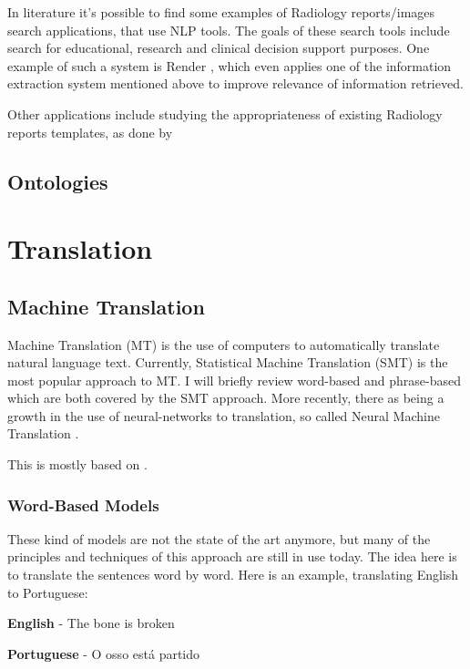 In literature it's possible to find some examples of Radiology reports/images search applications, that use NLP tools. The goals of these search tools include search for educational, research and clinical decision support purposes. One example of such a system is Render \citep{Dang2009}, which even applies one of the information extraction system mentioned above \citep{Dreyer2005} to improve relevance of information retrieved.

Other applications include studying the appropriateness of existing Radiology reports templates, as done by \citep{Hong2013}

\subsection{Ontologies}

\section{Translation}

\subsection{Machine Translation}

Machine Translation (MT) is the use of computers to automatically translate natural language text. Currently, Statistical Machine Translation (SMT) is the most popular approach to MT. I will briefly review word-based and phrase-based which are both covered by the SMT approach. More recently, there as being a growth in the use of neural-networks to translation, so called Neural Machine Translation \citep{Bentivogli2016}. 

This is mostly based on \citep{Koehn2010}.

\subsubsection{Word-Based Models}

These kind of models are not the state of the art anymore, but many of the principles and techniques of this approach are still in use today. The idea here is to translate the sentences word by word. Here is an example, translating English to Portuguese:

\begin{center}
\textbf{English}    - The bone    is      broken

\textbf{Portuguese} -  O  osso   está     partido
\end{center}
	
